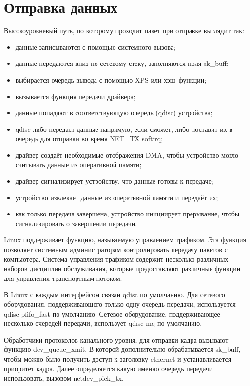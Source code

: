 \section{Отправка данных}

Высокоуровневый путь, по которому проходит пакет при отправке выглядит так:
\begin{itemize}[label=---]
	\item данные записываются с помощью системного вызова;
	\item данные передаются вниз по сетевому стеку, заполняются поля sk\_buff;
	\item выбирается очередь вывода с помощью XPS или хэш--функции;
	\item вызывается функция передачи драйвера;
	\item данные попадают в соответствующую очередь (qdisc) устройства;
	\item qdisc либо передаст данные напрямую, если сможет, либо поставит их в очередь для отправки во время NET\_TX softirq;
	\item драйвер создаёт необходимые отображения DMA, чтобы устройство могло считывать данные из оперативной памяти;
	\item драйвер сигнализирует устройству, что данные готовы к передаче;
	\item устройство извлекает данные из оперативной памяти и передаёт их;
	\item как только передача завершена, устройство инициирует прерывание, чтобы сигнализировать о завершении передачи.
\end{itemize}

Linux поддерживает функцию, называемую управлением трафиком. Эта функция позволяет системным администраторам контролировать передачу пакетов с компьютера. Система управления трафиком содержит несколько различных наборов дисциплин обслуживания, которые предоставляют различные функции для управления транспортным потоком. 

В Linux с каждым интерфейсом связан qdisc по умолчанию. Для сетевого оборудования, поддерживающего только одну очередь передачи, используется qdisc pfifo\_fast по умолчанию. Сетевое оборудование, поддерживающее несколько очередей передачи, использует qdisc mq по умолчанию.

Обработчики протоколов канального уровня, для отправки кадра вызывают функцию dev\_queue\_xmit. В которой дополнительно обрабатывается sk\_buff, чтобы можно было получить доступ к заголовку ethernet и устанавливается приоритет кадра. Далее определяется какую именно очередь передачи использовать, вызовом netdev\_pick\_tx.

